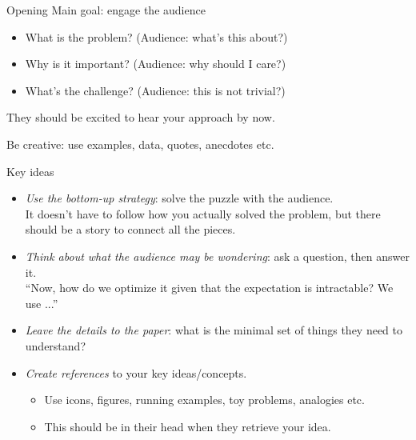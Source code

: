 \documentclass[usenames,dvipsnames,11pt,aspectratio=169]{beamer}
\begin{document}
\begin{frame}
    {Opening}
    Main goal: engage the audience\\
    \begin{itemize}
        \item What is the problem? (Audience: what's this about?)
        \item Why is it important? (Audience: why should I care?)
        \item What's the challenge? (Audience: this is not trivial?)
    \end{itemize}
    They should be excited to hear your approach by now.

    Be creative: use examples, data, quotes, anecdotes etc.
\end{frame}

\begin{frame}
    {Key ideas}
    \begin{itemize}
        \item \emph{Use the bottom-up strategy}: solve the puzzle with the audience. \\
                It doesn't have to follow how you actually solved the problem,
                but there should be a story to connect all the pieces.
            \item \emph{Think about what the audience may be wondering}: ask a question, then answer it. \\
            ``Now, how do we optimize it given that the expectation is intractable? We use ...''
        \item \emph{Leave the details to the paper}: what is the minimal set of things they need to understand?
        \item \emph{Create references} to your key ideas/concepts.
            \begin{itemize}
                \item Use icons, figures, running examples, toy problems, analogies etc.
                \item This should be in their head when they retrieve your idea.
            \end{itemize}
    \end{itemize}
\end{frame}
\end{document}
